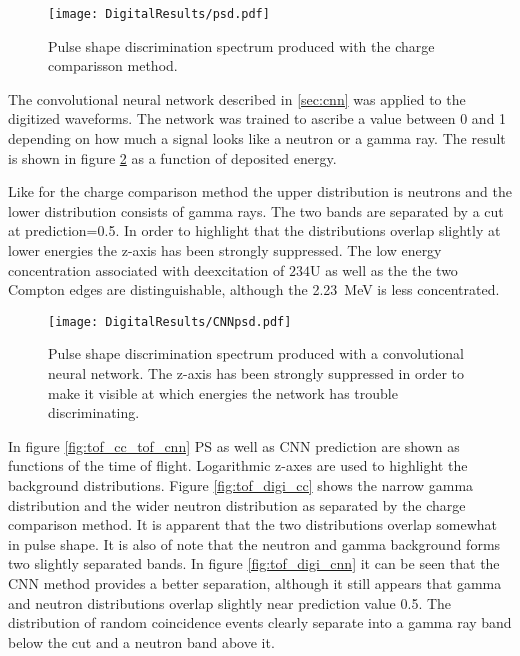 \documentclass[main.tex]{subfiles}
\begin{document}
\begin{figure}[ht]
    \centering
        \texttt{[image: DigitalResults/psd.pdf]}
        \caption[PSD spectrum, digital setup.]{Pulse shape discrimination spectrum produced with the charge comparisson method.}
        \label{fig:psd_d}
\end{figure}

The convolutional neural network described in \ref{sec:cnn} was applied to the digitized waveforms. The network was trained to ascribe a value between 0 and 1 depending on how much a signal looks like a neutron or a gamma ray. The result is shown in figure \ref{fig:cnn_E} as a function of deposited energy. 

Like for the charge comparison method the upper distribution is neutrons and the lower distribution consists of gamma rays. The two bands are separated by a cut at prediction=0.5. In order to highlight that the distributions overlap slightly at lower energies the z-axis has been strongly suppressed. The low energy concentration associated with deexcitation of $\text{234}$U as well as the the two Compton edges are distinguishable, although the \SI{2.23}{\MeV} is less concentrated.

\begin{figure}[ht]
    \centering
        \texttt{[image: DigitalResults/CNNpsd.pdf]}
        \caption[PSD spectrum obtained with CNN]{Pulse shape discrimination spectrum produced with a convolutional neural network. The z-axis has been strongly suppressed in order to make it visible at which energies the network has trouble discriminating.}
    \label{fig:cnn_E} 
\end{figure}

In figure \ref{fig:tof_cc_tof_cnn} PS as well as CNN prediction are shown as functions of the time of flight. Logarithmic z-axes are used to highlight the background distributions. Figure \ref{fig:tof_digi_cc} shows the narrow gamma distribution and the wider neutron distribution as separated by the charge comparison method. It is apparent that the two distributions overlap somewhat in pulse shape. It is also of note that the neutron and gamma background forms two slightly separated bands.  In figure \ref{fig:tof_digi_cnn} it can be seen that the CNN method provides a better separation, although it still appears that gamma and neutron distributions overlap slightly near prediction value 0.5. The distribution of random coincidence events clearly separate into a gamma ray band below the cut and a neutron band above it.
\end{document}
